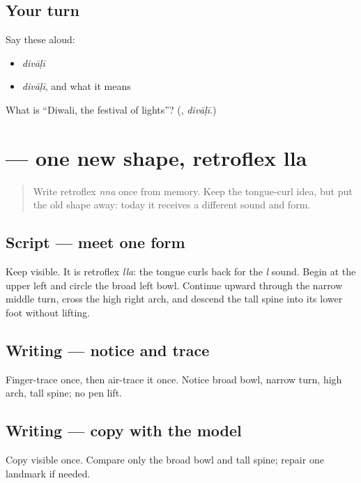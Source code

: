 \subsection*{Your turn}
Say these aloud:

\begin{itemize}
\raggedright
  \item \emph{divāḷī}
  \item \emph{divāḷī}, and what it means
\end{itemize}

\begin{tcolorbox}[breakable,colback=teal!4,colframe=teal!35!black,title={Before you move on}]
What is \textquotedblleft{}Diwali, the festival of lights\textquotedblright{}? (\textbf{}, \emph{divāḷī}.)
\end{tcolorbox}
\section[\texorpdfstring{\gu{ળ} (ḷa)}{ળ (ḷa)}]{ — one new shape, retroflex lla}

\label{lesson:GU-W04-lla}



\begin{quote}
Write retroflex \emph{nna} once from memory. Keep the tongue-curl idea, but put the old shape away: today it receives a different sound and form.
\end{quote}

\subsection*{Script — meet one form}
Keep \textbf{} visible. It is retroflex \emph{lla}: the tongue curls back for the \emph{l} sound. Begin at the upper left and circle the broad left bowl. Continue upward through the narrow middle turn, cross the high right arch, and descend the tall spine into its lower foot without lifting.

\subsection*{Writing — notice and trace}

Finger-trace \textbf{} once, then air-trace it once. Notice broad bowl, narrow turn, high arch, tall spine; no pen lift.

\subsection*{Writing — copy with the model}
Copy visible \textbf{} once. Compare only the broad bowl and tall spine; repair one landmark if needed.

